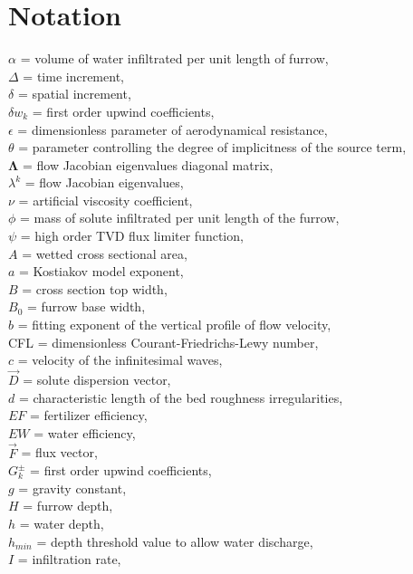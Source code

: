 \documentclass[review,authoryear]{elsarticle}
\begin{document}
\section*{Notation}
\noindent
$\alpha$ = volume of water infiltrated per unit length of furrow,\\
$\Delta$ = time increment,\\
$\delta$ = spatial increment,\\
$\delta w_k$ = first order upwind coefficients,\\
$\epsilon$ = dimensionless parameter of aerodynamical resistance,\\
$\theta$ = parameter controlling the degree of implicitness of
the source term,\\
$\mathbf{\Lambda}$ = flow Jacobian eigenvalues diagonal matrix,\\
$\lambda^k$ = flow Jacobian eigenvalues,\\
$\nu$ = artificial viscosity coefficient,\\
$\phi$ = mass of solute infiltrated per unit length of the furrow,\\
$\psi$ = high order TVD flux limiter function,\\
$A$ = wetted cross sectional area,\\
$a$ = Kostiakov model exponent,\\
$B$ = cross section top width,\\
$B_0$ = furrow base width,\\
$b$ = fitting exponent of the vertical profile of flow velocity,\\
CFL = dimensionless Courant-Friedrichs-Lewy number,\\
$c$ = velocity of the infinitesimal waves,\\
$\vec{D}$ = solute dispersion vector,\\
$d$ = characteristic length of the bed roughness irregularities,\\
$EF$ = fertilizer efficiency,\\
$EW$ = water efficiency,\\
$\vec{F}$ = flux vector,\\
$G_k^\pm$ = first order upwind coefficients,\\
$g$ = gravity constant,\\
$H$ = furrow depth,\\
$h$ = water depth,\\
$h_{min}$ = depth threshold value to allow water discharge,\\ 
$I$ = infiltration rate,\\
\end{document}
